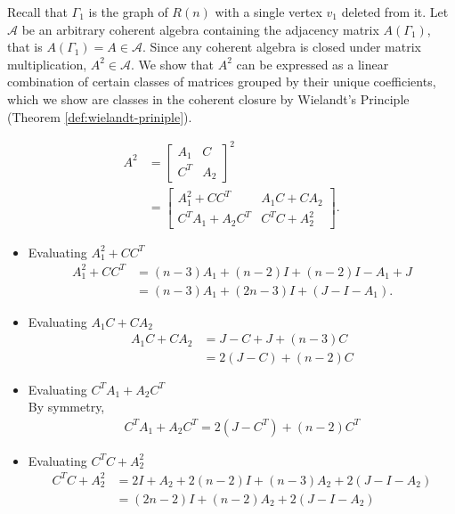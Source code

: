 Recall that $\Gamma_1$ is the graph of $R(n)$ with a single vertex $v_1$ deleted from it. Let $\mathcal{A}$ be an arbitrary coherent algebra containing the adjacency matrix $A(\Gamma_1)$, that is $A(\Gamma_1)=A\in\mathcal{A}$. Since any coherent algebra is closed under matrix multiplication, $A^2\in\mathcal{A}$. We show that $A^2$ can be expressed as a linear combination of certain classes of matrices grouped by their unique coefficients, which we show are classes in the coherent closure by Wielandt's Principle (Theorem \ref{def:wielandt-priniple}).

\begin{align*}
    A^2 &=
    \begin{bmatrix}
        A_1 & C \\
        C^T & A_2
    \end{bmatrix}^2 \\
    &= \begin{bmatrix}
        A_1^2 + CC^T & A_1C + CA_2 \\
        C^TA_1 + A_2C^T & C^TC + A_2^2
    \end{bmatrix}.
\end{align*}

\begin{itemize}
    \item Evaluating $A_1^2 + CC^T$\\
    \begin{align*}
        A_1^2 + CC^T &= (n-3)A_1 + (n-2)I + (n-2)I - A_1 + J \\
        &= (n-3)A_1 + (2n-3)I + (J-I-A_1).
    \end{align*}

    \item Evaluating $A_1C + CA_2$\\
    \begin{align*}
        A_1C + CA_2 &= J-C + J+(n-3)C\\
        &= 2(J-C) + (n-2)C
    \end{align*}

    \item Evaluating $C^TA_1 + A_2C^T$\\
    By symmetry,
    \begin{align*}
        C^TA_1 + A_2C^T = 2(J-C^T) + (n-2)C^T
    \end{align*}

    \item Evaluating $C^TC + A_2^2$\\
    \begin{align*}
         C^TC + A_2^2 &= 2I+A_2 + 2(n-2)I + (n-3)A_2 + 2(J-I-A_2)\\
         &= (2n-2)I + (n-2)A_2 + 2(J-I-A_2)
    \end{align*}
\end{itemize}

